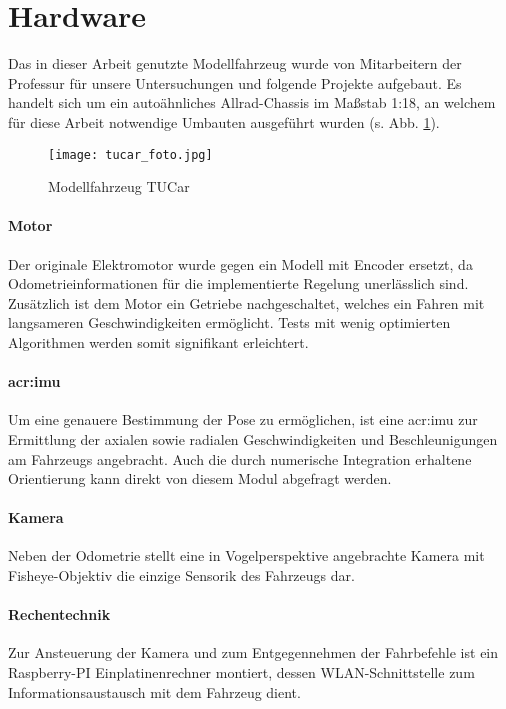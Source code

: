 \section{Hardware \dcsecondauthorshort}
Das in dieser Arbeit genutzte Modellfahrzeug wurde von Mitarbeitern der Professur für unsere Untersuchungen und folgende Projekte aufgebaut. Es handelt sich um ein autoähnliches Allrad-Chassis im Maßstab 1:18, an welchem für diese Arbeit notwendige Umbauten ausgeführt wurden (s. Abb. \ref{fig:tucar_foto}).
\begin{figure}[htbp] %
	\centering
	\texttt{[image: tucar\_foto.jpg]}
	\caption{Modellfahrzeug \glqq TUCar \grqq}
	\label{fig:tucar_foto}
\end{figure}
\paragraph{Motor}
Der originale Elektromotor wurde gegen ein Modell mit Encoder ersetzt, da Odometrieinformationen für die implementierte Regelung unerlässlich sind. Zusätzlich ist dem Motor ein Getriebe nachgeschaltet, welches ein Fahren mit langsameren Geschwindigkeiten ermöglicht. Tests mit wenig optimierten Algorithmen werden somit signifikant erleichtert.
\paragraph{\gls{acr:imu}}
Um eine genauere Bestimmung der Pose zu ermöglichen, ist eine \gls{acr:imu} zur Ermittlung der axialen sowie radialen Geschwindigkeiten und Beschleunigungen am Fahrzeugs angebracht. Auch die durch numerische Integration erhaltene Orientierung kann direkt von diesem Modul abgefragt werden. 
\paragraph{Kamera}
Neben der Odometrie stellt eine in Vogelperspektive angebrachte Kamera mit Fisheye-Objektiv die einzige Sensorik des Fahrzeugs dar.
\paragraph{Rechentechnik}
Zur Ansteuerung der Kamera und zum Entgegennehmen der Fahrbefehle ist ein Raspberry-PI Einplatinenrechner montiert, dessen WLAN-Schnittstelle zum Informationsaustausch mit dem Fahrzeug dient.
